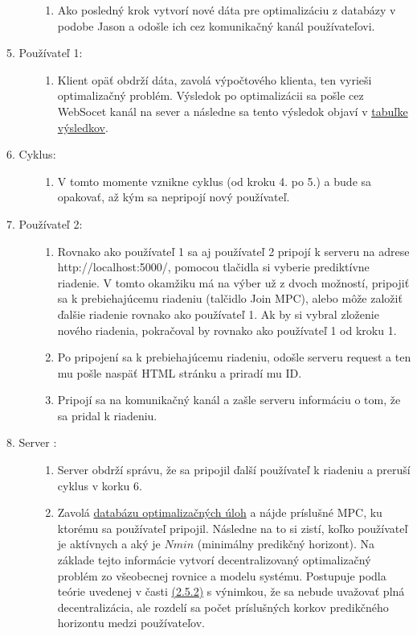 \begin{description}
{\begin{enumerate}
{}
\item{
Ako posledný krok vytvorí nové dáta pre optimalizáciu z databázy v podobe Jason a odošle ich cez komunikačný kanál používateľovi.
}
\end{enumerate}
}
\item[5. Používateľ 1:]{\hfill
	\begin{enumerate}
		\item{Klient opäť obdrží dáta, zavolá výpočtového klienta, ten vyrieši optimalizačný problém. Výsledok po optimalizácii sa pošle cez WebSocet kanál na sever a následne sa tento výsledok objaví v \hyperref[fig:Tabulka]{tabuľke výsledkov}.}
	\end{enumerate}
}
\item[6. Cyklus:]{\hfill
	\begin{enumerate}
		\item{V tomto momente vznikne cyklus (od kroku 4. po 5.) a bude sa opakovať, až kým sa nepripojí nový používateľ.}
	\end{enumerate}
}
\item[7. Používateľ 2:]{\hfill
	\begin{enumerate}
		\item{Rovnako ako používateľ 1 sa aj používateľ 2 pripojí k serveru na adrese http://localhost:5000/,  pomocou tlačidla si vyberie prediktívne riadenie. V tomto okamžiku má na výber už z dvoch možností, pripojiť sa k prebiehajúcemu riadeniu (talčidlo Join MPC), alebo môže založiť ďalšie riadenie rovnako ako používateľ 1. Ak by si vybral zloženie nového riadenia, pokračoval by rovnako ako používateľ 1 od kroku 1.}
		\item{
			Po pripojení sa k prebiehajúcemu riadeniu, odošle serveru request a ten mu pošle naspäť HTML stránku a priradí mu ID.
		}
		\item{ 
			Pripojí sa na komunikačný kanál a zašle serveru informáciu o tom, že sa pridal k riadeniu. 
		}
	\end{enumerate}
}
\item[8. Server :]{\hfill
	\begin{enumerate}
		\item{
			Server obdrží správu, že sa pripojil ďalší používateľ k riadeniu a preruší cyklus v korku 6.
		}
		\item{
			Zavolá \hyperref[DB:OPT]{databázu optimalizačných úloh} a nájde príslušné MPC, ku ktorému sa používateľ pripojil. Následne na to si zistí, koľko používateľ je aktívnych a aký je $Nmin$ (minimálny predikčný horizont). Na základe tejto informácie vytvorí decentralizovaný optimalizačný problém zo všeobecnej rovnice a modelu systému. Postupuje podla teórie uvedenej v časti \hyperref[subse:Nelin_MPC_ADMM]{(2.5.2)} s výnimkou, že sa nebude uvažovať plná decentralizácia, ale rozdelí sa počet príslušných korkov predikčného horizontu medzi používateľov.
}
\end{enumerate}}
\end{description}
